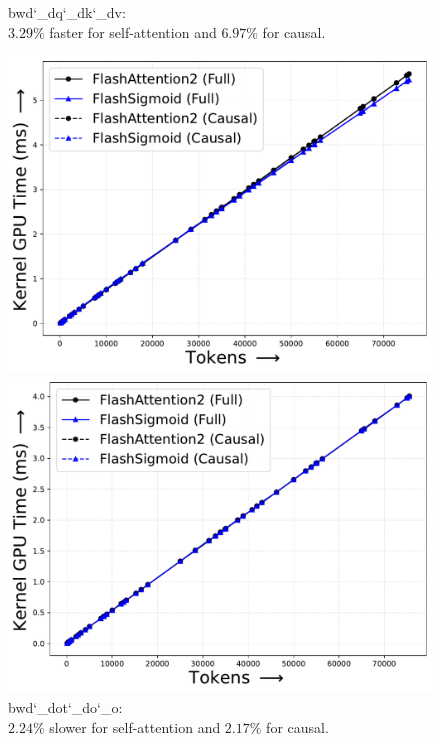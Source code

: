 \begin{figure}[!htbp]
\begin{minipage}{0.24\textwidth}
        \captionsetup{justification=centering} 
        \caption*{
            \textrm{bwd\char`_dq\char`_dk\char`_dv}:\\$3.29\%$ faster for self-attention and $6.97\%$ for causal.
        }
    \end{minipage}
    \hfill
    \begin{minipage}{0.24\textwidth}
        \centering        
        \includegraphics[trim={0 0 0 0}, width=\textwidth]{figures/_flash_figures/final_arxiv/f2/individual/h100/H100_noalibi_flash_bwd_dot_do_o_kernel_Full_-2.24_0.06_Causal_-2.17_0.06.pdf}
        \captionsetup{justification=centering} 
        \caption*{
            \textrm{bwd\char`_dot\char`_do\char`_o}:\\
            $2.24\%$ slower for self-attention and $2.17\%$ for causal.  
        }
    \end{minipage}
    \hfill
    \begin{minipage}{0.24\textwidth}
        \centering        
        \includegraphics[trim={0 0 0 0}, width=\textwidth]{figures/_flash_figures/final_arxiv/f2/individual/h100/H100_noalibi_flash_bwd_convert_dq_kernel_Full_0.03_0.05_Causal_-0.02_0.04.pdf}

\end{minipage}
\end{figure}
